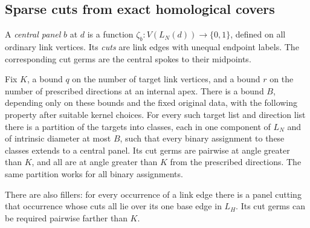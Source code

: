 \subsection{Sparse cuts from exact homological covers}

A \emph{central panel} $b$ at $d$ is a function
$\zeta_b:V(L_N(d))\to\{0,1\}$, defined on all ordinary link vertices.
Its \emph{cuts} are link edges with unequal endpoint labels.  The
corresponding cut germs are the central spokes to their midpoints.

\begin{proposition}
\label{fan:central-panels}\label{fan:sparse-panels}
Fix $K$, a bound $q$ on the number of target link vertices, and a bound
$r$ on the number of prescribed directions at an internal apex.
There is a bound $B$, depending only on these bounds and the fixed
original data, with the following property after suitable kernel
choices.  For every such target list and direction list there is a
partition of the targets into classes, each in one component of $L_N$
and of intrinsic diameter at most $B$, such that every binary
assignment to these classes extends to a central panel.  Its cut germs
are pairwise at angle greater than $K$, and all are at angle greater
than $K$ from the prescribed directions.  The same partition works
for all binary assignments.

There are also fillers: for every occurrence of a link edge there is
a panel cutting that occurrence whose cuts all lie over its one base
edge in $L_H$.  Its cut germs can be required pairwise farther than
$K$.
\end{proposition}

